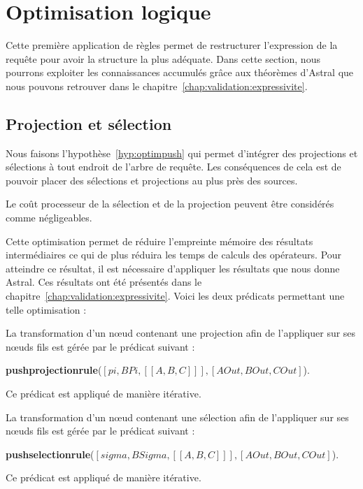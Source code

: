 \section{Optimisation logique}\label{sec:contrib:astronef:logique}
Cette première application de règles permet de restructurer l'expression de la requête pour avoir la structure la plus adéquate. Dans cette section, nous pourrons exploiter les connaissances accumulés grâce aux théorèmes d'Astral que nous pouvons retrouver dans le chapitre~\ref{chap:validation:expressivite}.

\subsection{Projection et sélection}
Nous faisons l'hypothèse~\ref{hyp:optimpush} qui permet d'intégrer des projections et sélections à tout endroit de l'arbre de requête. Les conséquences de cela est de pouvoir placer des sélections et projections au plus près des sources. 
\begin{hyp}\label{hyp:optimpush}
    Le coût processeur de la sélection et de la projection peuvent être considérés comme négligeables.
\end{hyp}
Cette optimisation permet de réduire l'empreinte mémoire des résultats intermédiaires ce qui de plus réduira les temps de calculs des opérateurs. Pour atteindre ce résultat, il est nécessaire d'appliquer les résultats que nous donne Astral. Ces résultats ont été présentés dans le chapitre~\ref{chap:validation:expressivite}. Voici les deux prédicats permettant une telle optimisation :
\begin{regle}
La transformation d'un nœud contenant une projection afin de l'appliquer sur ses nœuds fils est gérée par le prédicat suivant :
\begin{center} \textbf{pushprojectionrule}($[pi,BPi,[[A,B,C]]],[AOut,BOut,COut]$).\end{center}
Ce prédicat est appliqué de manière itérative.
\end{regle}
\begin{regle}
La transformation d'un nœud contenant une sélection afin de l'appliquer sur ses nœuds fils est gérée par le prédicat suivant :
\begin{center} \textbf{pushselectionrule}($[sigma,BSigma,[[A,B,C]]],[AOut,BOut,COut]$).\end{center}
Ce prédicat est appliqué de manière itérative.
\end{regle}

